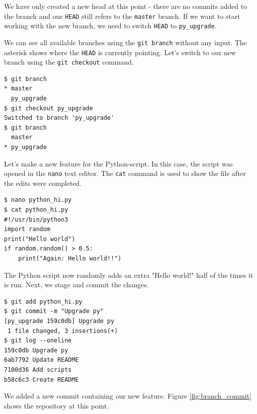 \documentclass[../main/git_course_main.tex]{subfiles}
\begin{document}
We have only created a new head at this point - there are no commits added to the branch and our \verb$HEAD$ still refers to the \verb$master$ branch. If we want to start working with the new branch, we need to switch \verb$HEAD$ to \verb$py_upgrade$.

We can see all available branches using the \verb$git branch$ without any
input. The asterisk shows where the \verb$HEAD$ is currently pointing.
Let's switch to our new branch using the \verb$git checkout$ command.

\begin{codebox}
\begin{lstlisting}
$ git branch
* master
  py_upgrade
$ git checkout py_upgrade
Switched to branch 'py_upgrade'
$ git branch 
  master
* py_upgrade
\end{lstlisting}
\end{codebox}

Let's make a new feature for the Python-script. In this case, the script was opened in the \verb$nano$ text editor. The \verb$cat$ command is used to show the file after the edits were completed.

\begin{codebox}
\begin{lstlisting}
$ nano python_hi.py
$ cat python_hi.py
#!/usr/bin/python3
import random
print("Hello world")
if random.random() > 0.5:
    print("Again: Hello world!!")
\end{lstlisting}
\end{codebox}

The Python script now randomly adds an extra "Hello world!" half of the times it is run. Next, we stage and commit the changes.

\begin{codebox}
\begin{lstlisting}
$ git add python_hi.py
$ git commit -m "Upgrade py"
[py_upgrade 159c0db] Upgrade py
 1 file changed, 3 insertions(+)
$ git log --oneline
159c0db Upgrade py
6ab7792 Update README
7100d36 Add scripts
b58c6c3 Create README
\end{lstlisting}
\end{codebox}

We added a new commit containing our new feature. Figure \ref{fig:branch_commit} shows the repository at this point.
\end{document}
